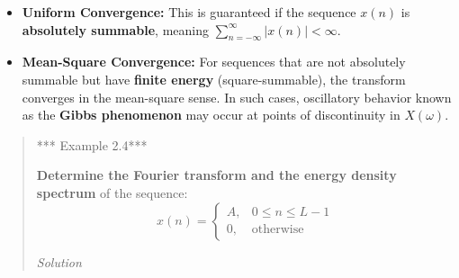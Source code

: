 \begin{itemize}
\tightlist
\item
  \textbf{Uniform Convergence:} This is guaranteed if the sequence
  \(x(n)\) is \textbf{absolutely summable}, meaning
  \(\sum_{n=-\infty}^{\infty} |x(n)| < \infty\).
\item
  \textbf{Mean-Square Convergence:} For sequences that are not
  absolutely summable but have \textbf{finite energy} (square-summable),
  the transform converges in the mean-square sense. In such cases,
  oscillatory behavior known as the \textbf{Gibbs phenomenon} may occur
  at points of discontinuity in \(X(\omega)\).
\end{itemize}

\begin{quote}
*** Example 2.4***

\textbf{Determine the Fourier transform and the energy density spectrum}
of the sequence:
\[x(n) = \begin{cases} A, & 0 \leq n \le L-1 \\ 0, & \text{otherwise} \end{cases}\]

\emph{Solution}


\end{quote}
